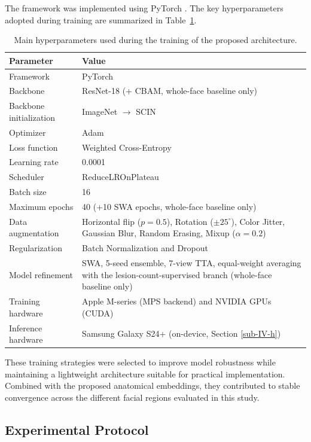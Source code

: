 \documentclass[conference]{IEEEtran}
\begin{document}
The framework was implemented using PyTorch \cite{b24}. The key hyperparameters adopted during training are summarized in Table~\ref{tab2}. \begin{table}[H]
\caption{Main hyperparameters used during the training of the proposed architecture.}
\begin{center}
\small
\begin{tabular}{|l|p{4.8cm}|}
\hline
\textbf{Parameter} & \textbf{Value} \\
\hline
Framework & PyTorch \\
\hline
Backbone & ResNet-18 (+ CBAM, whole-face baseline only) \\
\hline
Backbone initialization & ImageNet $\rightarrow$ SCIN \\
\hline
Optimizer & Adam \\
\hline
Loss function & Weighted Cross-Entropy \\
\hline
Learning rate & 0.0001 \\
\hline
Scheduler & ReduceLROnPlateau \\
\hline
Batch size & 16 \\
\hline
Maximum epochs & 40 (+10 SWA epochs, whole-face baseline only) \\
\hline
Data augmentation & Horizontal flip ($p=0.5$), Rotation ($\pm25^\circ$), Color Jitter, Gaussian Blur, Random Erasing, Mixup ($\alpha=0.2$) \\
\hline
Regularization & Batch Normalization and Dropout \\
\hline
Model refinement & SWA, 5-seed ensemble, 7-view TTA, equal-weight averaging with the lesion-count-supervised branch (whole-face baseline only) \\
\hline
Training hardware & Apple M-series (MPS backend) and NVIDIA GPUs (CUDA) \\
\hline
Inference hardware & Samsung Galaxy S24+ (on-device, Section \ref{sub-IV-h}) \\
\hline
\end{tabular}
\label{tab2}
\end{center}
\end{table}

These training strategies were selected to improve model robustness while maintaining a lightweight architecture suitable for practical implementation. Combined with the proposed anatomical embeddings, they contributed to stable convergence across the different facial regions evaluated in this study.

\subsection{Experimental Protocol}\label{sub-III-d}
\end{document}

